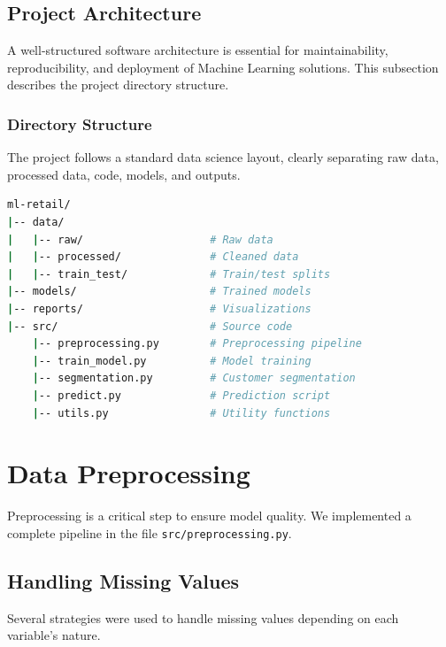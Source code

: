 \documentclass[12pt,a4paper]{article}
\begin{document}
\subsection{Project Architecture}

A well-structured software architecture is essential for maintainability, reproducibility, and deployment of Machine Learning solutions. This subsection describes the project directory structure.

\subsubsection{Directory Structure}

The project follows a standard data science layout, clearly separating raw data, processed data, code, models, and outputs.

\begin{lstlisting}[language=bash]
ml-retail/
|-- data/
|   |-- raw/                    # Raw data
|   |-- processed/              # Cleaned data
|   |-- train_test/             # Train/test splits
|-- models/                     # Trained models
|-- reports/                    # Visualizations
|-- src/                        # Source code
    |-- preprocessing.py        # Preprocessing pipeline
    |-- train_model.py          # Model training
    |-- segmentation.py         # Customer segmentation
    |-- predict.py              # Prediction script
    |-- utils.py                # Utility functions
\end{lstlisting}

\section{Data Preprocessing}

Preprocessing is a critical step to ensure model quality. We implemented a complete pipeline in the file \texttt{src/preprocessing.py}.

\subsection{Handling Missing Values}

Several strategies were used to handle missing values depending on each variable's nature.
\end{document}
